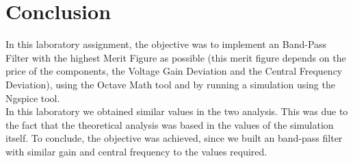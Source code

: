 




\section{Conclusion}
\label{sec:conclusion}

In this laboratory assignment, the objective was to implement an Band-Pass Filter with the highest Merit Figure as possible (this merit figure depends on the price of the components, the Voltage Gain Deviation and the Central Frequency Deviation), using the Octave Math tool and by running a simulation using the Ngspice tool.\\

In this laboratory we obtained similar values in the two analysis. This was due to the fact that the theoretical analysis was based in the values of the simulation itself.  
To conclude, the objective was achieved, since we built an band-pass filter with similar gain and central frequency to the values required.





